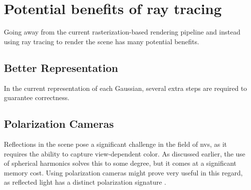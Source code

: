 \section{Potential benefits of ray tracing}
Going away from the current rasterization-based rendering pipeline and instead using ray tracing to render the scene has many potential benefits.

\subsection{Better Representation}
In the current representation of each Gaussian, several extra steps are required to guarantee correctness.

\subsection{Polarization Cameras}
Reflections in the scene pose a significant challenge in the field of \gls{nvs}, as it requires the ability to capture view-dependent color.
As discussed earlier, the use of spherical harmonics solves this to some degree, but it comes at a significant memory cost.
Using polarization cameras might prove very useful in this regard, as reflected light has a distinct polarization signature \cite{lingUniversityPhysicsVolume2016}.

